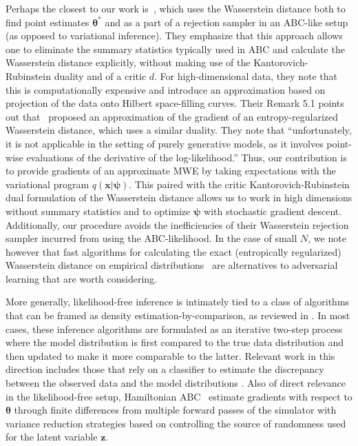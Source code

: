 \documentclass[twocolumn,superscriptaddress,aps]{revtex4-1}
\newcommand{\bftheta}{{\bm \theta}}
\newcommand{\bfpsi}{{\bm \psi}}
\newcommand{\bfx}{\mathbf{x}}
\newcommand{\bfz}{\mathbf{z}}
\theoremstyle{plain}
\begin{document}
Perhaps the closest to our work is~\cite{bernton2017inference}, which uses the
Wasserstein distance both to find point estimates $\bftheta^*$ and as a part of
a rejection sampler in an ABC-like setup (as opposed to variational inference).
They emphasize that this approach allows one to eliminate the summary statistics
typically used in ABC and calculate the Wasserstein distance explicitly, without
making use of the Kantorovich-Rubinstein duality and of a critic $d$. For high-dimensional
data, they note that this is computationally expensive and introduce an
approximation based on projection of the data onto Hilbert space-filling curves.
Their Remark 5.1 points out that~\citep{montavon2016wasserstein} proposed an
approximation of the gradient of an entropy-regularized Wasserstein distance,
which uses a similar duality. They note that ``unfortunately, it is not
applicable in the setting of purely generative models, as it involves point-wise
evaluations of the derivative of the log-likelihood.'' Thus, our contribution is
to provide gradients of an approximate MWE by taking expectations with the
variational program $q(\bfx | \bfpsi)$. This paired with the critic
Kantorovich-Rubinstein dual formulation of the Wasserstein distance
allows us to work in high dimensions without summary statistics and to
optimize $\bfpsi$ with stochastic gradient descent. Additionally,
our procedure avoids the inefficiencies of
their Wasserstein rejection sampler incurred from using the ABC-likelihood.
In the case of small $N$, we note however that fast algorithms for calculating the exact (entropically regularized) Wasserstein distance on
empirical distributions~\citep{cuturi2013sinkhorn, genevay2016stochastic, montavon2016wasserstein}
are alternatives to adversarial learning that are worth considering.

More generally, likelihood-free
inference is intimately tied to a class of algorithms that can be framed as
density estimation-by-comparison, as reviewed in \cite{2016arXiv161003483M}. In most cases, these
inference algorithms are formulated as an iterative two-step process where the
model distribution is first compared to the true data distribution and then
updated to make it more comparable to the latter. Relevant work in this
direction includes those that rely on a classifier to estimate the discrepancy between the observed data and the model distributions
\citep{gutmann2012noise,cranmer2015approximating,cranmer2016experiments,2016arXiv161110242D,gutmann2017likelihood,rosca2017variational}.
Also of direct relevance in the likelihood-free setup, Hamiltonian ABC~\citep{meeds2015hamiltonian}
estimate gradients with respect
to $\bftheta$ through finite differences from multiple forward passes of the
simulator with variance reduction strategies based on controlling the source of
randomness used for the latent variable $\bfz$.
\end{document}
